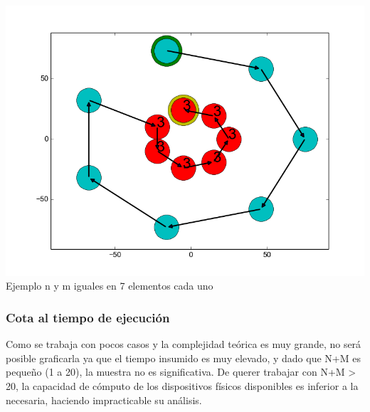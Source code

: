 \vspace*{0.3cm} \vspace*{0.3cm}
  \begin{center}
 \includegraphics[scale=0.6]{./EJ1/anilloexacto.png}
 {\\Ejemplo n y m iguales en 7 elementos cada uno}
  \end{center}
  \vspace*{0.3cm}


 \subsubsection*{Cota al tiempo de ejecución}


Como se trabaja con pocos casos y la complejidad te\'orica es muy grande, no ser\'a posible graficarla ya que el tiempo insumido es muy elevado, y dado que N+M es pequeño (1 a 20), la muestra no es significativa. De querer trabajar con N+M > 20, la capacidad de cómputo de los dispositivos físicos disponibles es inferior a la necesaria, haciendo impracticable su análisis.



